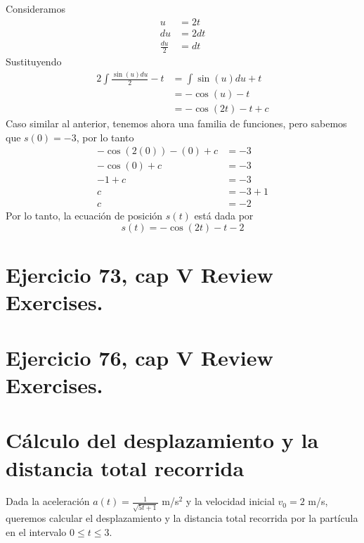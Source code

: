 \documentclass[11pt,letterpaper]{article}
\begin{document}
Consideramos
\begin{equation*}
  \begin{split}
    u &= 2t\\
    du &= 2dt\\
    \frac{du}{2} &= dt
  \end{split}
\end{equation*}
Sustituyendo
\begin{equation*}
  \begin{split}
    2\int \frac{\sin(u)du}{2}-t &= \int \sin(u)du + t\\
    &= -\cos(u)-t\\
    &= -\cos(2t)-t+c
  \end{split}
\end{equation*}
Caso similar al anterior, tenemos ahora una familia de funciones, pero sabemos que $s(0)=-3$, por lo tanto
\begin{equation*}
  \begin{split}
    -\cos(2(0))-(0)+c &= -3\\
    -\cos(0)+c &= -3\\
    -1+c &= -3 \\
    c &= -3 + 1\\
    c &= -2
  \end{split}
\end{equation*}
Por lo tanto, la ecuación de posición $s(t)$ está dada por
\begin{equation*}
  s(t)=-\cos(2t)-t-2
\end{equation*}

\section{Ejercicio 73, cap V Review Exercises.}

\section{Ejercicio 76, cap V Review Exercises.}
\section*{Cálculo del desplazamiento y la distancia total recorrida}

Dada la aceleración \(a(t) = \frac{1}{\sqrt{5t + 1}}\) m/s\(^2\) y la velocidad inicial \(v_0 = 2\) m/s, queremos calcular el desplazamiento y la distancia total recorrida por la partícula en el intervalo \(0 \leq t \leq 3\).
\end{document}
